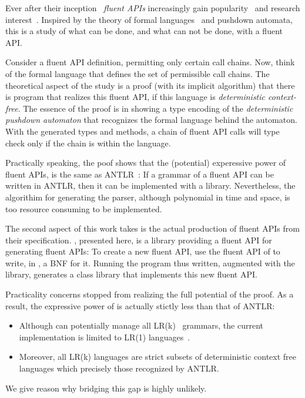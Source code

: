 Ever after their inception~\cite{Fowler:web:2005} \emph{fluent APIs}
  increasingly gain popularity~\cite{Bauer:2005,Freeman:Pryce:06,Larsen:2012} and research
  interest~\cite{Deursen:2000,Kabanov:2008}.
Inspired by the theory of formal languages~\cite{Linz:2001} and pushdown automata,
  this is a study of what can be done, and what can not be done, with a fluent API.

Consider a fluent API definition, permitting only certain call chains.
Now, think of the formal language that defines the set of permissible call chains.
The theoretical aspect of the study is a proof (with its implicit algorithm) that
  there is \Java program that realizes this fluent API, if this
  language is \emph{deterministic context-free}.
The essence of the proof is in showing a \Java type encoding of
  the \emph{deterministic pushdown automaton} that recognizes
  the formal language behind the automaton.
With the generated types and methods, a chain of fluent API calls
  will type check only if the chain is within the language.

Practically speaking, the poof shows that the (potential)
  experessive power of fluent APIs,
  is the same as ANTLR~\cite{Parr:1995:I:Dont:Think:Its:Correct}:
If a grammar of a fluent API can be written in ANTLR, then it
  can be implemented with a \Java library.
Nevertheless, the algorithim for generating the parser, although polynomial
  in time and space, is too resource consuming to be implemented. 

The second aspect of this work takes is the actual production 
  of fluent APIs from their specification.
\Self, presented here, is a \Java library providing a fluent API for generating fluent APIs:
To create a new fluent API, use the fluent API of \Self to write, in \Java, a BNF for it.
Running the \Java program thus written, augmented with the \Self library,
  generates a \Java class library that implements this new fluent API.

Practicality concerns stopped \Self from realizing the full potential of the proof.
As a result, the expressive power of \Self is actually stictly less than that of ANTLR:
\begin{itemize}
  \item Although \Self can potentially manage all LR(k)~\cite{tomer:is:this:true} grammars,
        the current implementation is limited to LR(1) languages~\cite{Tomer:is:this:true?}.
  \item Moreover, all LR(k) languages are strict subsets of deterministic context free languages
      which precisely those recognized by ANTLR.
\end{itemize}
We give reason why bridging this gap is highly unlikely.

